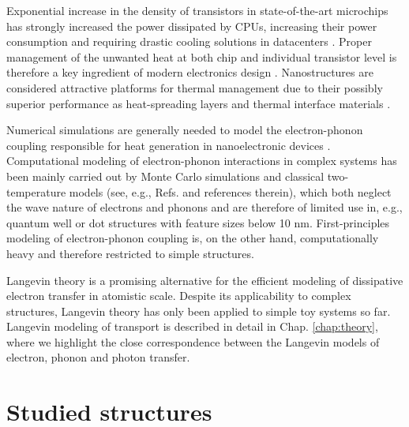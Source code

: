 Exponential increase in the density of transistors in state-of-the-art microchips has strongly increased the power dissipated by CPUs, increasing their power consumption and requiring drastic cooling solutions in datacenters \cite{pop10}. Proper management of the unwanted heat at both chip and individual transistor level is therefore a key ingredient of modern electronics design \cite{moore14}. Nanostructures are considered attractive platforms for thermal management due to their possibly superior performance as heat-spreading layers and thermal interface materials \cite{moore14}. 

Numerical simulations are generally needed to model the electron-phonon coupling responsible for heat generation in nanoelectronic devices \cite{pop06_ieee}. Computational modeling of electron-phonon interactions in complex systems has been mainly carried out by Monte Carlo simulations and classical two-temperature models (see, e.g., Refs. \cite{chen01,chen06,sadi06,guo12} and references therein), which both neglect the wave nature of electrons and phonons and are therefore of limited use in, e.g., quantum well or dot structures with feature sizes below 10 nm. First-principles modeling of electron-phonon coupling \cite{luisier09} is, on the other hand, computationally heavy and therefore restricted to simple structures.

Langevin theory \cite{dhar03,roy07,jacquet09} is a promising alternative for the efficient modeling of dissipative electron transfer in atomistic scale. Despite its applicability to complex structures, Langevin theory has only been applied to simple toy systems so far. Langevin modeling of transport is described in detail in Chap. \ref{chap:theory}, where we highlight the close correspondence between the Langevin models of electron, phonon and photon transfer. 

\section{Studied structures}

